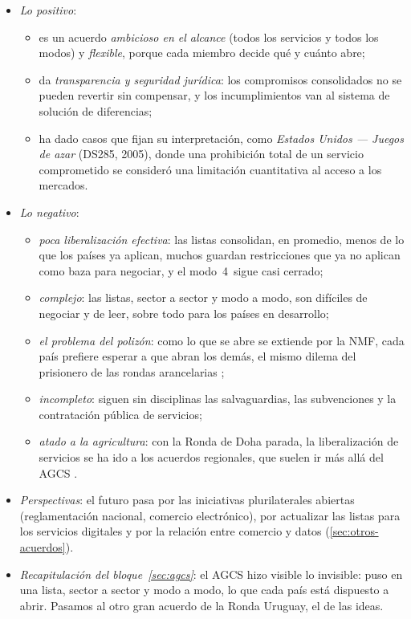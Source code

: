 \documentclass[11pt]{article}
\begin{document}
\begin{itemize}
\item \emph{Lo positivo}:
  \begin{itemize}
  \item es un acuerdo \emph{ambicioso en el alcance} (todos los servicios y todos los modos) y \emph{flexible}, porque cada miembro decide qué y cuánto abre;
  \item da \emph{transparencia y seguridad jurídica}: los compromisos consolidados no se pueden revertir sin compensar, y los incumplimientos van al sistema de solución de diferencias;
  \item ha dado casos que fijan su interpretación, como \emph{Estados Unidos — Juegos de azar} (DS285, 2005), donde una prohibición total de un servicio comprometido se consideró una limitación cuantitativa al acceso a los mercados\nocite{OMC2005DS285}.
  \end{itemize}
\item \emph{Lo negativo}:
  \begin{itemize}
  \item \emph{poca liberalización efectiva}: las listas consolidan, en promedio, menos de lo que los países ya aplican, muchos guardan restricciones que ya no aplican como baza para negociar, y el modo~4~sigue casi cerrado;
  \item \emph{complejo}: las listas, sector a sector y modo a modo, son difíciles de negociar y de leer, sobre todo para los países en desarrollo;
  \item \emph{el problema del polizón}: como lo que se abre se extiende por la NMF, cada país prefiere esperar a que abran los demás, el mismo dilema del prisionero de las rondas arancelarias ;
  \item \emph{incompleto}: siguen sin disciplinas las salvaguardias, las subvenciones y la contratación pública de servicios;
  \item \emph{atado a la agricultura}: con la Ronda de Doha parada, la liberalización de servicios se ha ido a los acuerdos regionales, que suelen ir más allá del AGCS .
  \end{itemize}
\item \emph{Perspectivas}: el futuro pasa por las iniciativas plurilaterales abiertas (reglamentación nacional, comercio electrónico), por actualizar las listas para los servicios digitales y por la relación entre comercio y datos (\ref{sec:otros-acuerdos}).
\item \emph{Recapitulación del bloque~\ref{sec:agcs}}: el AGCS hizo visible lo invisible: puso en una lista, sector a sector y modo a modo, lo que cada país está dispuesto a abrir. Pasamos al otro gran acuerdo de la Ronda Uruguay, el de las ideas.
\end{itemize}
\end{document}
